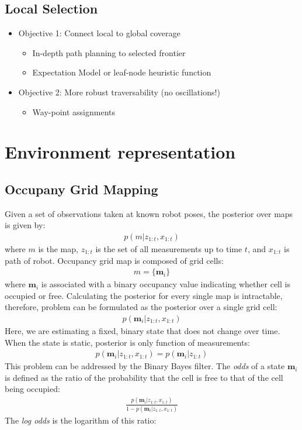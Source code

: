 \documentclass[letterpaper, 10 pt, conference]{ieeeconf}  %
\begin{document}
\subsection{Local Selection}

\begin{itemize}
  \item Objective 1: Connect local to global coverage
  \begin{itemize}
  \item In-depth path planning to selected frontier
  \item Expectation Model or leaf-node heuristic function
  \end{itemize}
  \item Objective 2: More robust traversability (no oscillations!)
  \begin{itemize}
  \item Way-point assignments 
  \end{itemize}
\end{itemize}


\section{Environment representation}
\subsection{Occupany Grid Mapping}
Given a set of observations taken at known robot poses, the posterior over maps is given by:
\begin{align}
    p(m | z_{1:t},x_{1:t})
\end{align}
\noindent where $m$ is the map, $z_{1:t}$ is the set of all measurements up to time $t$, and $x_{1:t}$ is path of robot. 
Occupancy grid map is composed of grid cells:
\begin{align}
    m = \{\textbf{m}_i\}
\end{align}
\noindent where $\textbf{m}_i$ is associated with a binary occupancy value indicating whether cell is occupied or free. Calculating the posterior for every single map is intractable, therefore, problem can be formulated as the posterior over a single grid cell: 
\begin{align}
    p(\textbf{m}_i | z_{1:t},x_{1:t})
\end{align}
Here, we are estimating a fixed, binary state that does not change over time. When the state is static, posterior is only function of measurements:
\begin{align}
    p(\textbf{m}_i | z_{1:t},x_{1:t}) = p(\textbf{m}_i | z_{1:t})
    \label{static}
\end{align}
This problem can be addressed by the Binary Bayes filter. The \emph{odds} of a state $\textbf{m}_i$ is defined as the ratio of the probability that the cell is free to that of the cell being occupied:
\begin{align}
    \frac{p(\textbf{m}_i | z_{1:t},x_{1:t})}{1-p(\textbf{m}_i | z_{1:t},x_{1:t})}
    \label{odd}
\end{align}
The \emph{log odds} is the logarithm of this ratio:
\end{document}
